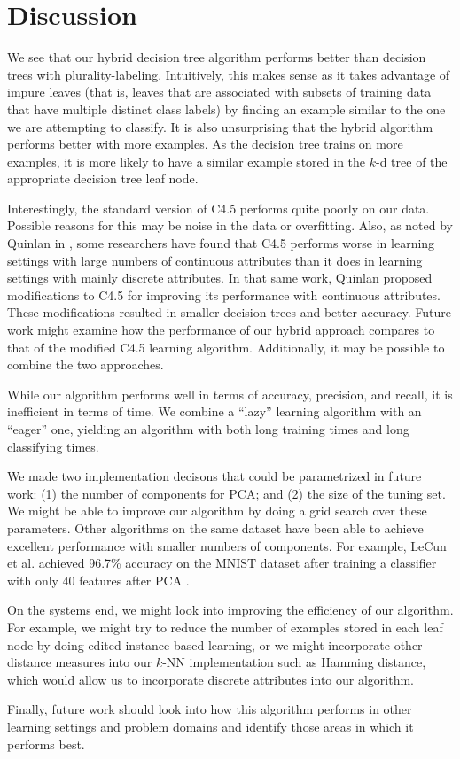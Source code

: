 \section{Discussion}

We see that our hybrid decision tree algorithm performs better than decision trees with plurality-labeling. Intuitively, this makes sense as it takes advantage of impure leaves (that is, leaves that are associated with subsets of training data that have multiple distinct class labels) by finding an example similar to the one we are attempting to classify. It is also unsurprising that the hybrid algorithm performs better with more examples. As the decision tree trains on more examples, it is more likely to have a similar example stored in the $k$-d tree of the appropriate decision tree leaf node.

Interestingly, the standard version of C4.5 performs quite poorly on our data. Possible reasons for this may be noise in the data or overfitting. Also, as noted by Quinlan in \cite{quinlan1996improved}, some researchers have found that C4.5 performs worse in learning settings with large numbers of continuous attributes than it does in learning settings with mainly discrete attributes. In that same work, Quinlan proposed modifications to C4.5 for improving its performance with continuous attributes. These modifications resulted in smaller decision trees and better accuracy. Future work might examine how the performance of our hybrid approach compares to that of the modified C4.5 learning algorithm.  Additionally, it may be possible to combine the two approaches.

While our algorithm performs well in terms of accuracy, precision, and recall, it is inefficient in terms of time. We combine a ``lazy'' learning algorithm with an ``eager'' one, yielding an algorithm with both long training times and long classifying times.

We made two implementation decisons that could be parametrized in future work: (1) the number of components for PCA; and (2) the size of the tuning set. We might be able to improve our algorithm by doing a grid search over these parameters. Other algorithms on the same dataset have been able to achieve excellent performance with smaller numbers of components.  For example, LeCun et al. achieved 96.7\% accuracy on the MNIST dataset after training a classifier with only 40 features after PCA \cite{lecun1998gradient}.

On the systems end, we might look into improving the efficiency of our algorithm. For example, we might try to reduce the number of examples stored in each leaf node by doing edited instance-based learning, or we might incorporate other distance measures into our $k$-NN implementation such as Hamming distance, which would allow us to incorporate discrete attributes into our algorithm.

Finally, future work should look into how this algorithm performs in other learning settings and problem domains and identify those areas in which it performs best.
